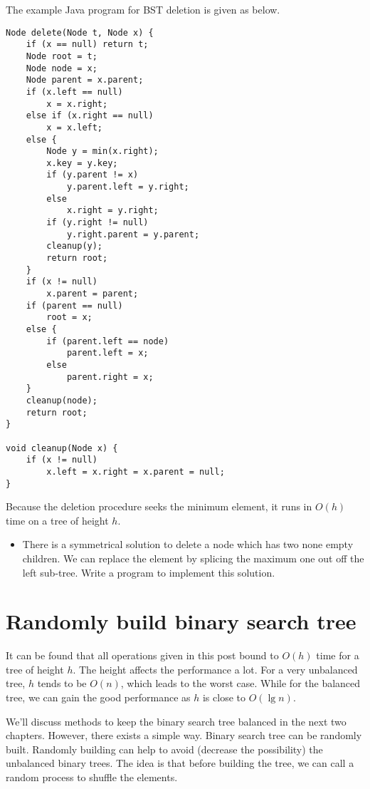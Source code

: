 \documentclass{article}
\begin{document}
The example Java program for BST deletion is given as below.

\lstset{language=Java}
\begin{lstlisting}
Node delete(Node t, Node x) {
    if (x == null) return t;
    Node root = t;
    Node node = x;
    Node parent = x.parent;
    if (x.left == null)
        x = x.right;
    else if (x.right == null)
        x = x.left;
    else {
        Node y = min(x.right);
        x.key = y.key;
        if (y.parent != x)
            y.parent.left = y.right;
        else
            x.right = y.right;
        if (y.right != null)
            y.right.parent = y.parent;
        cleanup(y);
        return root;
    }
    if (x != null)
        x.parent = parent;
    if (parent == null)
        root = x;
    else {
        if (parent.left == node)
            parent.left = x;
        else
            parent.right = x;
    }
    cleanup(node);
    return root;
}

void cleanup(Node x) {
    if (x != null)
        x.left = x.right = x.parent = null;
}
\end{lstlisting}

Because the deletion procedure seeks the minimum element, it runs in $O(h)$ time on a tree of height $h$.

\begin{Exercise}

\begin{itemize}
\item There is a symmetrical solution to delete a node which has two
none empty children. We can replace the element by splicing the maximum one out off the left sub-tree. Write a program to implement this solution.
\end{itemize}

\end{Exercise}

\section{Randomly build binary search tree}
It can be found that all operations given in this post bound to $O(h)$
time for a tree of height $h$. The height affects the performance
a lot. For a very unbalanced tree, $h$ tends to be $O(n)$, which leads
to the worst case. While for the balanced tree, we can gain the good performance as $h$ is close to $O(\lg n)$.

We'll discuss methods to keep the binary search tree
balanced in the next two chapters. However, there exists a simple
way. Binary search tree can be randomly built\cite{CLRS}.
Randomly building can help to avoid (decrease the possibility) the unbalanced
binary trees. The idea is that before building the tree, we can call a random process to shuffle the elements.
\end{document}
